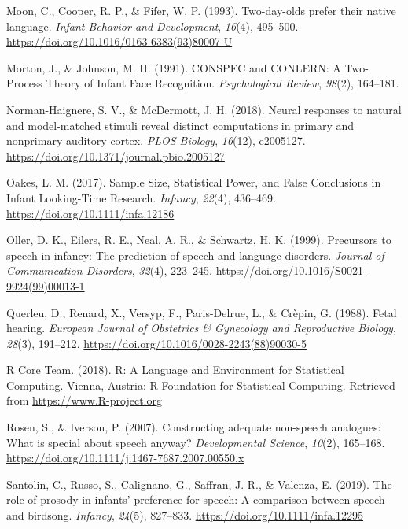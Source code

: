 \documentclass[man]{apa6}
\begin{document}
\leavevmode\hypertarget{ref-moon_two-day-olds_1993}{}%
Moon, C., Cooper, R. P., \& Fifer, W. P. (1993). Two-day-olds prefer their native language. \emph{Infant Behavior and Development}, \emph{16}(4), 495--500. \url{https://doi.org/10.1016/0163-6383(93)80007-U}

\leavevmode\hypertarget{ref-morton_conspec_1991}{}%
Morton, J., \& Johnson, M. H. (1991). CONSPEC and CONLERN: A Two-Process Theory of Infant Face Recognition. \emph{Psychological Review}, \emph{98}(2), 164--181.

\leavevmode\hypertarget{ref-norman-haignere_neural_2018}{}%
Norman-Haignere, S. V., \& McDermott, J. H. (2018). Neural responses to natural and model-matched stimuli reveal distinct computations in primary and nonprimary auditory cortex. \emph{PLOS Biology}, \emph{16}(12), e2005127. \url{https://doi.org/10.1371/journal.pbio.2005127}

\leavevmode\hypertarget{ref-oakes_sample_2017}{}%
Oakes, L. M. (2017). Sample Size, Statistical Power, and False Conclusions in Infant Looking-Time Research. \emph{Infancy}, \emph{22}(4), 436--469. \url{https://doi.org/10.1111/infa.12186}

\leavevmode\hypertarget{ref-oller_precursors_1999}{}%
Oller, D. K., Eilers, R. E., Neal, A. R., \& Schwartz, H. K. (1999). Precursors to speech in infancy: The prediction of speech and language disorders. \emph{Journal of Communication Disorders}, \emph{32}(4), 223--245. \url{https://doi.org/10.1016/S0021-9924(99)00013-1}

\leavevmode\hypertarget{ref-querleu_fetal_1988}{}%
Querleu, D., Renard, X., Versyp, F., Paris-Delrue, L., \& Crèpin, G. (1988). Fetal hearing. \emph{European Journal of Obstetrics \& Gynecology and Reproductive Biology}, \emph{28}(3), 191--212. \url{https://doi.org/10.1016/0028-2243(88)90030-5}

\leavevmode\hypertarget{ref-r_core_team_r:_2018}{}%
R Core Team. (2018). R: A Language and Environment for Statistical Computing. Vienna, Austria: R Foundation for Statistical Computing. Retrieved from \url{https://www.R-project.org}

\leavevmode\hypertarget{ref-rosen_constructing_2007}{}%
Rosen, S., \& Iverson, P. (2007). Constructing adequate non-speech analogues: What is special about speech anyway? \emph{Developmental Science}, \emph{10}(2), 165--168. \url{https://doi.org/10.1111/j.1467-7687.2007.00550.x}

\leavevmode\hypertarget{ref-santolin_role_2019}{}%
Santolin, C., Russo, S., Calignano, G., Saffran, J. R., \& Valenza, E. (2019). The role of prosody in infants' preference for speech: A comparison between speech and birdsong. \emph{Infancy}, \emph{24}(5), 827--833. \url{https://doi.org/10.1111/infa.12295}
\end{document}
